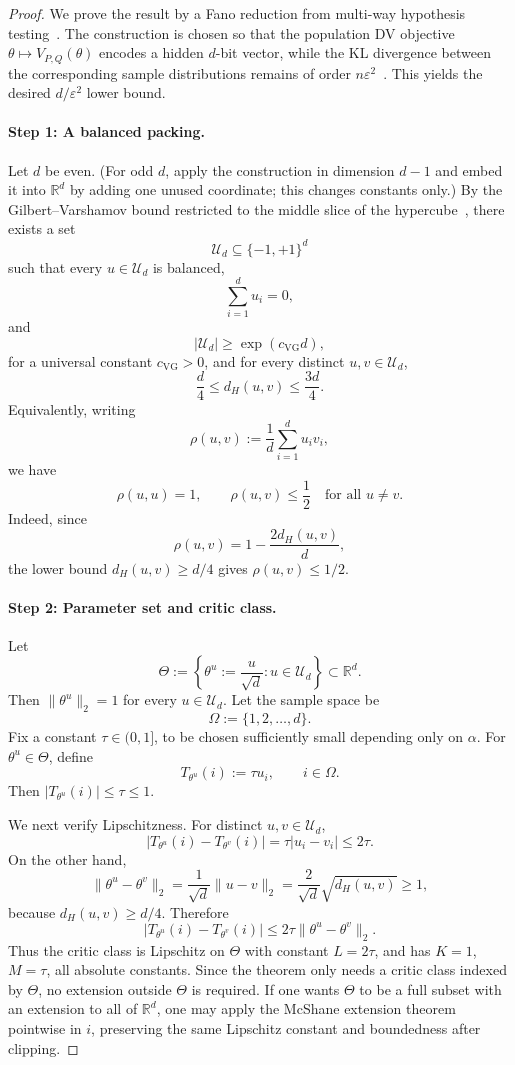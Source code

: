 \documentclass{article}
\theoremstyle{plain}
\theoremstyle{definition}
\theoremstyle{remark}
\begin{document}
\begin{proof}
We prove the result by a Fano reduction from multi-way hypothesis testing~\citep{CoverT2006}. The
construction is chosen so that the population DV objective
\(\theta\mapsto V_{P,Q}(\theta)\) encodes a hidden \(d\)-bit vector, while the
KL divergence between the corresponding sample distributions remains of order
\(n\varepsilon^2\)~\cite{Alabi26}. This yields the desired \(d/\varepsilon^2\) lower bound.

\paragraph{Step 1: A balanced packing.}
Let \(d\) be even. 
(For odd \(d\), apply the construction in dimension \(d-1\) and embed it into
\(\mathbb R^d\) by adding one unused coordinate; this changes constants only.)
By the Gilbert--Varshamov bound restricted to the middle
slice of the hypercube~\citep{bok:MW}, there exists a set
\[
    \mathcal U_d\subseteq \{-1,+1\}^d
\]
such that every \(u\in\mathcal U_d\) is balanced,
\[
    \sum_{i=1}^d u_i=0,
\]
and
\[
    |\mathcal U_d|\ge \exp(c_{\mathrm{VG}}d),
\]
for a universal constant \(c_{\mathrm{VG}}>0\), and for every distinct
\(u,v\in\mathcal U_d\),
\[
    \frac d4 \le d_H(u,v)\le \frac{3d}{4}.
\]
Equivalently, writing
\[
    \rho(u,v):=\frac1d\sum_{i=1}^d u_i v_i,
\]
we have
\[
    \rho(u,u)=1,
    \qquad
    \rho(u,v)\le \frac12
    \quad\text{for all }u\ne v.
\]
Indeed, since
\[
    \rho(u,v)=1-\frac{2d_H(u,v)}{d},
\]
the lower bound \(d_H(u,v)\ge d/4\) gives \(\rho(u,v)\le 1/2\).

\paragraph{Step 2: Parameter set and critic class.}
Let
\[
    \Theta:=\left\{\theta^u:=\frac{u}{\sqrt d}:u\in\mathcal U_d\right\}
    \subset \mathbb R^d.
\]
Then \(\|\theta^u\|_2=1\) for every \(u\in\mathcal U_d\). Let the sample space be
\[
    \Omega:=\{1,2,\ldots,d\}.
\]
Fix a constant \(\tau\in(0,1]\), to be chosen sufficiently small depending only
on \(\alpha\). For \(\theta^u\in\Theta\), define
\[
    T_{\theta^u}(i):=\tau u_i,\qquad i\in\Omega.
\]
Then \(|T_{\theta^u}(i)|\le \tau\le 1\).

We next verify Lipschitzness. For distinct \(u,v\in\mathcal U_d\),
\[
    |T_{\theta^u}(i)-T_{\theta^v}(i)|
    =
    \tau |u_i-v_i|
    \le 2\tau.
\]
On the other hand,
\[
    \|\theta^u-\theta^v\|_2
    =
    \frac{1}{\sqrt d}\|u-v\|_2
    =
    \frac{2}{\sqrt d}\sqrt{d_H(u,v)}
    \ge 1,
\]
because \(d_H(u,v)\ge d/4\). Therefore
\[
    |T_{\theta^u}(i)-T_{\theta^v}(i)|
    \le 2\tau \|\theta^u-\theta^v\|_2.
\]
Thus the critic class is Lipschitz on \(\Theta\) with constant \(L=2\tau\), and
has \(K=1\), \(M=\tau\), all absolute constants. Since the theorem only needs a
critic class indexed by \(\Theta\), no extension outside \(\Theta\) is required.
If one wants \(\Theta\) to be a full subset with an extension to all of
\(\mathbb R^d\), one may apply the McShane extension theorem~\citep{McSHANE1934ExtensionOR,Whitney34} pointwise in
\(i\), preserving the same Lipschitz constant and boundedness after clipping.


\end{proof}
\end{document}
